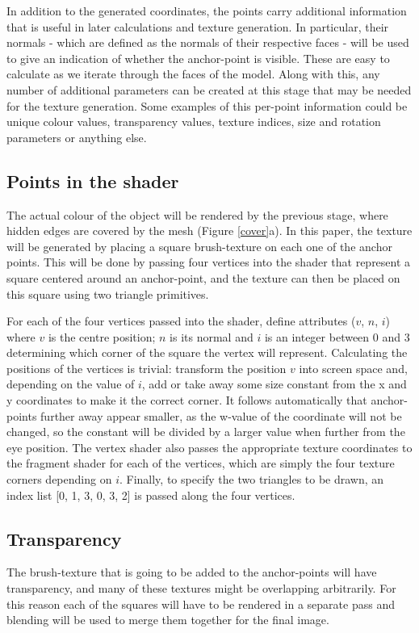 \documentclass[a4paper,10pt]{article}
\begin{document}
In addition to the generated coordinates, the points carry additional information that is useful in later calculations and texture generation. In particular, their normals - which are defined as the normals of their respective faces - will be used to give an indication of whether the anchor-point is visible. These are easy to calculate as we iterate through the faces of the model. Along with this, any number of additional parameters can be created at this stage that may be needed for the texture generation. Some examples of this per-point information could be unique colour values, transparency values, texture indices, size and rotation parameters or anything else.


\subsection{Points in the shader}
The actual colour of the object will be rendered by the previous stage, where hidden edges are covered by the mesh (Figure \ref{cover}a). In this paper, the texture will be generated by placing a square brush-texture on each one of the anchor points. This will be done by passing four vertices into the shader that represent a square centered around an anchor-point, and the texture can then be placed on this square using two triangle primitives.

For each of the four vertices passed into the shader, define attributes ($v$, $n$, $i$) where $v$ is the centre position; $n$ is its normal and $i$ is an integer between 0 and 3 determining which corner of the square the vertex will represent. Calculating the positions of the vertices is trivial: transform the position $v$ into screen space and, depending on the value of $i$, add or take away some size constant from the x and y coordinates to make it the correct corner. It follows automatically that anchor-points further away appear smaller, as the w-value of the coordinate will not be changed, so the constant will be divided by a larger value when further from the eye position. The vertex shader also passes the appropriate texture coordinates to the fragment shader for each of the vertices, which are simply the four texture corners depending on $i$. Finally, to specify the two triangles to be drawn, an index list [0, 1, 3, 0, 3, 2] is passed along the four vertices.


\subsection{Transparency}
The brush-texture that is going to be added to the anchor-points will have transparency, and many of these textures might be overlapping arbitrarily. For this reason each of the squares will have to be rendered in a separate pass and blending will be used to merge them together for the final image.
\end{document}
